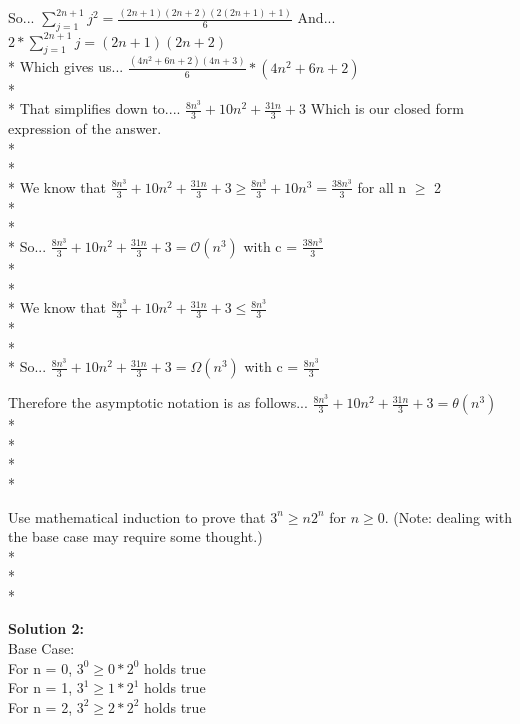 \documentclass{article}
\begin{document}
So...
$\displaystyle\sum\limits_{j=1}^{2n+1} j^2 = \frac{(2n+1)(2n+2)(2(2n+1)+1)}{6}$
And...
$2 * \displaystyle\sum\limits_{j=1}^{2n+1} j = (2n+1)(2n+2)$
\\*
Which gives us...
$\displaystyle\frac{(4n^2 + 6n + 2)(4n+3)}{6} * (4n^2 + 6n + 2)$
\\* \\*
That simplifies down to....
$\frac{8n^3}{3} + 10n^2 + \frac{31n}{3} + 3$ Which is our closed form expression of the answer.
\\* \\* \\*
We know that $\frac{8n^3}{3} + 10n^2 + \frac{31n}{3} + 3 \geq \frac{8n^3}{3} + 10n^3 = \frac{38n^3}{3}$ for all n $\geq$ 2
\\* \\* \\*
So...
$\frac{8n^3}{3} + 10n^2 + \frac{31n}{3} + 3 = \mathcal{O}(n^3)$ with c = $\frac{38n^3}{3}$
\\* \\* \\*
We know that $\frac{8n^3}{3} + 10n^2 + \frac{31n}{3} + 3 \leq \frac{8n^3}{3}$
\\* \\* \\*
So...
$\frac{8n^3}{3} + 10n^2 + \frac{31n}{3} + 3 = \Omega(n^3)$ with c = $\frac{8n^3}{3}$


Therefore the asymptotic notation is as follows...
$\frac{8n^3}{3} + 10n^2 + \frac{31n}{3} + 3 = \theta(n^3)$
\\* \\* \\* \\*


\begin{problem}
Use mathematical induction to prove that $3^n \ge n2^n$ for $n\ge 0$. 
(Note: dealing with the base case may require some thought.)
\\* \\* \\*
\end{problem}

\textbf{Solution 2:}\\

Base Case:\\
For n = 0, $3^0 \geq 0*2^0$ holds true\\
For n = 1, $3^1 \geq 1*2^1$ holds true\\
For n = 2, $3^2 \geq 2*2^2$ holds true\\
\end{document}
